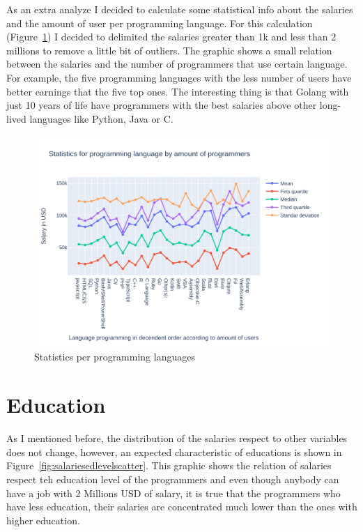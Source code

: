 \documentclass{article}
\begin{document}
As an extra analyze I decided to calculate some statistical info about the salaries and the amount of user per programming language. For this calculation (Figure~\ref{fig:statisticsperamountofusers}) I decided to delimited the salaries greater than 1k and less than 2 millions to remove a little bit of outliers. The graphic shows a small relation between the salaries and the number of programmers that use certain language. For example, the five programming languages with the less number of users have better earnings that the five top ones. The interesting thing is that Golang with just 10 years of life have programmers with the best salaries above other long-lived languages like Python, Java or C.

\begin{figure}[ht]
    \centering
    \includegraphics[width=\textwidth]{images/statistics_programm.pdf}
    \caption{Statistics per programming languages}
    \label{fig:statisticsperamountofusers}
\end{figure}{}
\section{Education}
As I mentioned before, the distribution of the salaries respect to other variables does not change, however, an expected characteristic of educations is shown in Figure~\ref{fig:salariesedlevelscatter}. This graphic shows the relation of salaries respect teh education level of the programmers and even though anybody can have a job with 2 Millions USD of salary, it is true that the programmers who have less education, their salaries are concentrated much lower than the ones with higher education.
\end{document}
